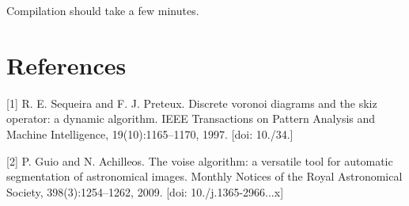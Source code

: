 Compilation should take a few minutes.\hypertarget{index_references_sec}{}\section{References}\label{index_references_sec}
\mbox{[}1\mbox{]} R. E. Sequeira and F. J. Preteux. Discrete voronoi diagrams and the skiz operator\+: a dynamic algorithm. I\+E\+EE Transactions on Pattern Analysis and Machine Intelligence, 19(10)\+:1165–1170, 1997. \mbox{[}doi\+: 10./34.\mbox{]}

\mbox{[}2\mbox{]} P. Guio and N. Achilleos. The voise algorithm\+: a versatile tool for automatic segmentation of astronomical images. Monthly Notices of the Royal Astronomical Society, 398(3)\+:1254–1262, 2009. \mbox{[}doi\+: 10./j.1365-\/2966...\+x\mbox{]} 